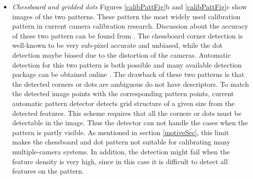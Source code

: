 \documentclass{report}
\begin{document}
\begin{itemize}
	\item \textit{Chessboard and gridded dots} Figures \ref{calibPattFig}b and \ref{calibPattFig}c show images of the two patterns. These pattern the most widely used calibration pattern in current camera calibration research. Discussion about the accuracy of these two pattern can be found from \cite{mallon2007pattern}. The chessboard corner detection is well-known to be very sub-pixel accurate and unbiased, while the dot detection maybe biased due to the distortion of the cameras. Automatic detection for this two pattern is both possible and many available detection package can be obtained online \cite{opencv_library, rufli2008automatic, geiger2012automatic}. 
	The drawback of these two patterns is that the detected corners or dots are ambiguous do not have descriptors. To match the detected image points with the corresponding pattern points, current automatic pattern detector detects grid structure of a given size from the detected features. This scheme requires that all the corners or dots must be detectable in the image. Thus the detector can not handle the cases when the pattern is partly visible. As mentioned in section \ref{motiveSec}, this limit makes the chessboard and dot pattern not suitable for calibrating many multiple-camera systems. In addition, the detection might fail when the feature density is very high, since in this case it is difficult to detect all features on the pattern. 

\end{itemize}
\end{document}
